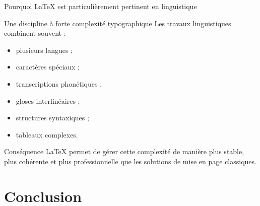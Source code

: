 \documentclass[aspectratio=169]{beamer}
\begin{document}
	
	\begin{frame}{Pourquoi \LaTeX{} est particulièrement pertinent en linguistique}
		\begin{block}{Une discipline à forte complexité typographique}
			Les travaux linguistiques combinent souvent :
			\begin{itemize}
				\item plusieurs langues ;
				\item caractères spéciaux ;
				\item transcriptions phonétiques ;
				\item gloses interlinéaires ;
				\item structures syntaxiques ;
				\item tableaux complexes.
			\end{itemize}
		\end{block}
		
		\vspace{0.4cm}
		
		\begin{alertblock}{Conséquence}
			\LaTeX{} permet de gérer cette complexité de manière plus stable, plus cohérente et plus professionnelle que les solutions de mise en page classiques.
		\end{alertblock}
		
	\end{frame}
	
	
	
	\section{Conclusion}
	
\end{document}
